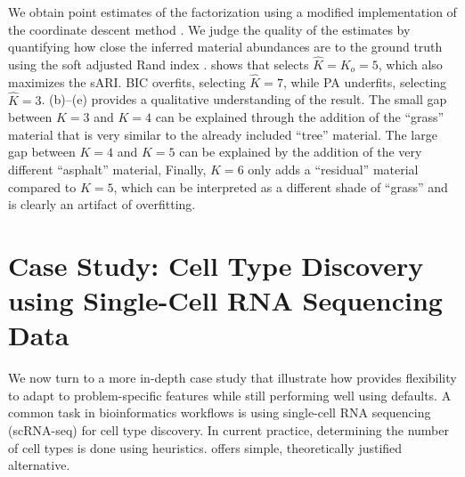 We obtain point estimates of the factorization using a modified implementation of the coordinate descent method \citep{Cichocki-Phan_coorddesc_2009}.
We judge the quality of the estimates by quantifying how close the inferred material abundances are
to the ground truth
using the soft adjusted Rand index \citep[sARI;][]{Flynt_sARI_2019}.
 shows that \methodname selects $\widehat{K} = K_{o} = 5$,
which also maximizes the sARI. %
BIC overfits, selecting $\widehat{K} = 7$, while PA underfits, selecting $\widehat{K} = 3$.
(b)--(e) provides a qualitative understanding of the result.
The small gap between $K=3$ and $K=4$ can be explained through the addition of the ``grass'' material that is
very similar to the already included ``tree'' material. 
The large gap between $K=4$ and $K=5$ can be explained by the addition of the very different ``asphalt'' material, 
Finally, $K=6$ only adds a ``residual'' material compared to $K=5$, which can be interpreted as a different shade of ``grass''
and is clearly an artifact of overfitting.

\section{Case Study: Cell Type Discovery using Single-Cell RNA Sequencing Data} \label{sec:case-study}

We now turn to a more in-depth case study that illustrate how
\methodname provides flexibility to adapt to problem-specific features while still performing well using defaults. 
A common task in bioinformatics workflows is using 
single-cell RNA sequencing (scRNA-seq) for cell type discovery. 
In current practice, determining the number of cell types is done
using heuristics.
\methodname offers simple, theoretically justified alternative. 

